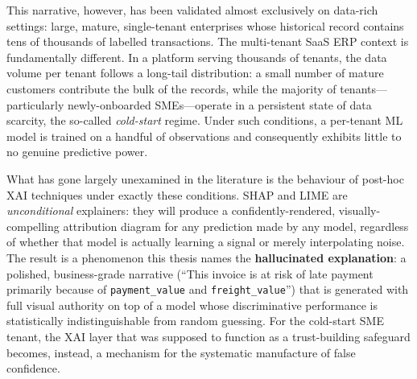 This narrative, however, has been validated almost exclusively on data-rich settings: large, mature, single-tenant enterprises whose historical record contains tens of thousands of labelled transactions. The multi-tenant SaaS ERP context is fundamentally different. In a platform serving thousands of tenants, the data volume per tenant follows a long-tail distribution: a small number of mature customers contribute the bulk of the records, while the majority of tenants---particularly newly-onboarded SMEs---operate in a persistent state of data scarcity, the so-called \emph{cold-start} regime. Under such conditions, a per-tenant ML model is trained on a handful of observations and consequently exhibits little to no genuine predictive power.

What has gone largely unexamined in the literature is the behaviour of post-hoc XAI techniques under exactly these conditions. SHAP and LIME are \emph{unconditional} explainers: they will produce a confidently-rendered, visually-compelling attribution diagram for any prediction made by any model, regardless of whether that model is actually learning a signal or merely interpolating noise. The result is a phenomenon this thesis names the \textbf{hallucinated explanation}: a polished, business-grade narrative (``This invoice is at risk of late payment primarily because of \texttt{payment\_value} and \texttt{freight\_value}'') that is generated with full visual authority on top of a model whose discriminative performance is statistically indistinguishable from random guessing. For the cold-start SME tenant, the XAI layer that was supposed to function as a trust-building safeguard becomes, instead, a mechanism for the systematic manufacture of false confidence.

